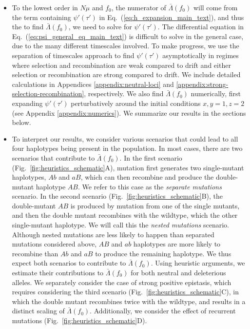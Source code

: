 \documentclass[aps,rmp,twocolumn,groupedaddress,floatfix,notitlepage]{revtex4-1}
\begin{document}
\begin{itemize}
\item To the lowest order in $N\mu$ and $f_0$, the numerator of $\bar{\Lambda}(f_0)$ will come from the term containing $\psi'(\tau')$ in Eq.~(\ref{eq:h_expansion_main_text}), and thus the to find $\bar{\Lambda}(f_0)$, we need to solve for $\psi'(\tau')$. The differential equation in Eq.~(\ref{eq:psi_general_eq_main_text}) is difficult to solve in the general case, due to the many different timescales involved. To make progress, we use the separation of timescales approach to find $\psi'(\tau')$ asymptotically in regimes where selection and recombination are weak compared to drift and either selection or recombination are strong compared to drift. We include detailed calculations in Appendices \ref{appendix:neutral-loci} and \ref{appendix:strong-selection-recombination}, respectively. We also find $\bar{\Lambda}(f_0)$ numerically, first expanding $\psi'(\tau')$ perturbatively around the initial conditions $x,y=1, z=2$ (see Appendix \ref{appendix:numerics}).
We summarize our results in the sections below.

\item To interpret our results, we consider various scenarios that could lead to all four haplotypes being present in the population. In most cases, there are two scenarios that contribute to $\bar{\Lambda}(f_0)$. In the first scenario (Fig.~\ref{fig:heuristics_schematic}A), mutation first generates two single-mutant haplotypes, $Ab$ and $aB$, which can then recombine and produce the double-mutant haplotype $AB$. We refer to this case as the \emph{separate mutations} scenario. In the second scenario (Fig.~\ref{fig:heuristics_schematic}B), the double-mutant $AB$ is produced by mutation from one of the single mutants, and then the double mutant recombines with the wildtype, which the other single-mutant haplotype. We will call this the \emph{nested mutations} scenario. Although nested mutations are less likely to happen than separated mutations considered above, $AB$ and $ab$ haplotypes are more likely to recombine than $Ab$ and $aB$ to produce the remaining haplotype. We thus expect both scenarios to contribute to $\bar{\Lambda}(f_0)$. Using heuristic arguments, we estimate their contributions to $\bar{\Lambda}(f_0)$ for both neutral and deleterious alleles. We separately consider the case of strong positive epistasis, which requires considering the third scenario (Fig.~\ref{fig:heuristics_schematic}C), in which the double mutant recombines twice with the wildtype, and results in a distinct scaling of $\bar{\Lambda}(f_0)$. Additionally, we consider the effect of recurrent mutations (Fig.~\ref{fig:heuristics_schematic}D).



\end{itemize}
\end{document}
